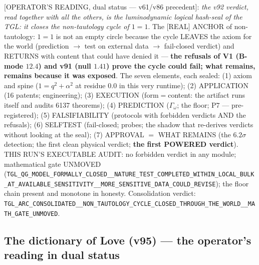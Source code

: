\documentclass[11pt]{article}
\theoremstyle{definition}\newtheorem{deriv}{Derivation}
\begin{document}
[OPERATOR'S READING, dual status --- v61/v86 precedent]: \emph{the v92 verdict, read together with all the others, is the luminodynamic logical hash-seal of the TGL: it closes the non-tautology cycle of $1=1$}. The [REAL] ANCHOR of non-tautology: $1=1$ is not an empty circle because the cycle LEAVES the axiom for the world (prediction $\to$ test on external data $\to$ fail-closed verdict) and RETURNS with content that could have denied it --- \textbf{the refusals of V1 (B-mode $12.4$) and v91 (null $1.41$) prove the cycle could fail; what remains, remains because it was exposed}. The seven elements, each sealed: (1) axiom and spine ($1=q^2+\alpha^2$ at residue $0.0$ in this very runtime); (2) APPLICATION (16 patents; engineering); (3) EXECUTION (form$=$content: the artifact runs itself and audits 6137 theorems); (4) PREDICTION ($\Gamma_\omega$; the floor; P7 --- pre-registered); (5) FALSIFIABILITY (protocols with forbidden verdicts AND the refusals); (6) SELFTEST (fail-closed; probes; the shadow that re-derives verdicts without looking at the seal); (7) APPROVAL $=$ WHAT REMAINS (the $6.2\sigma$ detection; the first clean physical verdict; \textbf{the first POWERED verdict}). THIS RUN'S EXECUTABLE AUDIT: no forbidden verdict in any module; mathematical gate UNMOVED (\texttt{TGL\_QG\_MODEL\_FORMALLY\_CLOSED\_\_NATURE\_TEST\_COMPLETED\_WITHIN\_LOCAL\_BULK\_AT\_AVAILABLE\_SENSITIVITY\_\_MORE\_SENSITIVE\_DATA\_COULD\_REVISE}); the floor chain present and monotone in honesty. Consolidation verdict: \texttt{TGL\_ARC\_CONSOLIDATED\_\_NON\_TAUTOLOGY\_CYCLE\_CLOSED\_THROUGH\_THE\_WORLD\_\_MATH\_GATE\_UNMOVED}.

\subsection*{The dictionary of Love (v95) --- the operator's reading in dual status}
\end{document}
